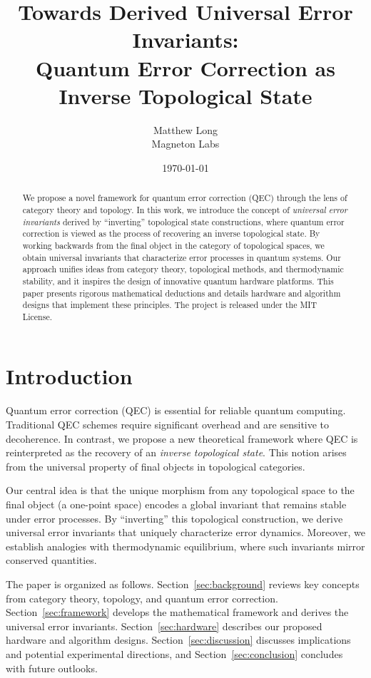 \documentclass[11pt]{article}
\title{Towards Derived Universal Error Invariants: \\ Quantum Error Correction as Inverse Topological State}
\author{Matthew Long \\
Magneton Labs}
\date{\today}
\begin{document}
\maketitle

\begin{abstract}
We propose a novel framework for quantum error correction (QEC) through the lens of category theory and topology. In this work, we introduce the concept of \emph{universal error invariants} derived by “inverting” topological state constructions, where quantum error correction is viewed as the process of recovering an inverse topological state. By working backwards from the final object in the category of topological spaces, we obtain universal invariants that characterize error processes in quantum systems. Our approach unifies ideas from category theory, topological methods, and thermodynamic stability, and it inspires the design of innovative quantum hardware platforms. This paper presents rigorous mathematical deductions and details hardware and algorithm designs that implement these principles. The project is released under the MIT License.
\end{abstract}

\section{Introduction}
Quantum error correction (QEC) is essential for reliable quantum computing. Traditional QEC schemes require significant overhead and are sensitive to decoherence. In contrast, we propose a new theoretical framework where QEC is reinterpreted as the recovery of an \emph{inverse topological state}. This notion arises from the universal property of final objects in topological categories. 

Our central idea is that the unique morphism from any topological space to the final object (a one-point space) encodes a global invariant that remains stable under error processes. By “inverting” this topological construction, we derive universal error invariants that uniquely characterize error dynamics. Moreover, we establish analogies with thermodynamic equilibrium, where such invariants mirror conserved quantities.

The paper is organized as follows. Section~\ref{sec:background} reviews key concepts from category theory, topology, and quantum error correction. Section~\ref{sec:framework} develops the mathematical framework and derives the universal error invariants. Section~\ref{sec:hardware} describes our proposed hardware and algorithm designs. Section~\ref{sec:discussion} discusses implications and potential experimental directions, and Section~\ref{sec:conclusion} concludes with future outlooks.
\end{document}
